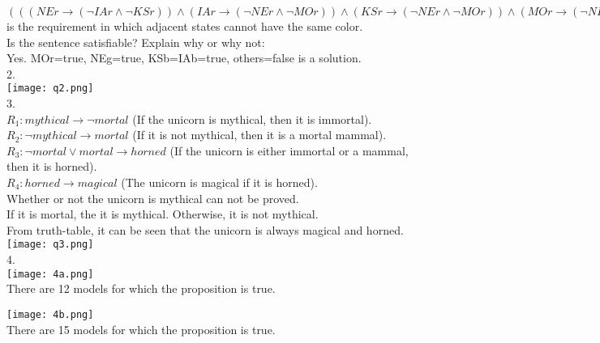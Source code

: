 \documentclass[a4paper]{article}
\begin{document}
$(((NEr \rightarrow (\neg IAr \wedge \neg KSr))\wedge (IAr \rightarrow (\neg NEr \wedge \neg MOr))\wedge (KSr \rightarrow (\neg NEr \wedge \neg MOr))\wedge (MOr \rightarrow (\neg NEr \wedge \neg IAr \wedge \neg KSr))))\wedge (((NEg \rightarrow (\neg IAg \wedge \neg KSg))\wedge (IAg \rightarrow (\neg NEg \wedge \neg MOg))\wedge (KSg \rightarrow (\neg NEg \wedge \neg MOg))\wedge (MOg \rightarrow (\neg NEg \wedge \neg IAg \wedge \neg KSg))))\wedge (((NEb \rightarrow (\neg IAb \wedge \neg KSb))\wedge (IAb \rightarrow (\neg NEb \wedge \neg MOb))\wedge (KSb \rightarrow (\neg NEb \wedge \neg MOb))\wedge (MOb \rightarrow (\neg NEb \wedge \neg IAb \wedge \neg KSb))))$ is the requirement in which adjacent states cannot have the same color.\\

Is the sentence satisfiable? Explain why or why not:\\
Yes. {MOr=true, NEg=true, KSb=IAb=true, others=false} is a solution.\\

2.\\
\texttt{[image: q2.png]}\\

3.\\
$R_1: mythical \rightarrow \neg mortal $ (If the unicorn is mythical, then it is immortal).\\
$R_2: \neg mythical \rightarrow mortal $ (If it is not mythical, then it is a mortal mammal).\\
$R_3: \neg mortal \vee mortal \rightarrow horned $ (If the unicorn is either immortal or a mammal, then it is horned).\\
$R_4: horned \rightarrow magical $ (The unicorn is magical if it is horned).\\

Whether or not the unicorn is mythical can not be proved. \\
If it is mortal, the it is mythical. Otherwise, it is not mythical.\\
From truth-table, it can be seen that the unicorn is always magical and horned.\\
\texttt{[image: q3.png]}\\

4.\\
\texttt{[image: 4a.png]}\\
There are 12 models for which the proposition is true.

\texttt{[image: 4b.png]}\\
There are 15 models for which the proposition is true.
\end{document}
